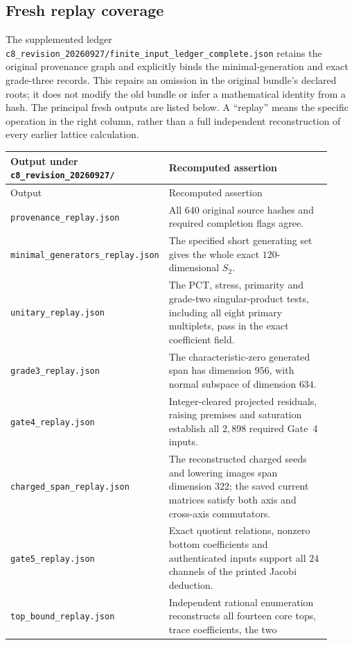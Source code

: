 \documentclass[11pt,a4paper]{article}
\theoremstyle{definition}
\newcommand{\artifact}[1]{\textnormal{\nolinkurl{#1}}}
\begin{document}
\subsection{Fresh replay coverage}
The supplemented ledger
\artifact{c8_revision_20260927/finite_input_ledger_complete.json}
retains the original provenance graph and explicitly binds the
minimal-generation and exact grade-three records. This repairs an
omission in the original bundle's declared roots; it does not modify
the old bundle or infer a mathematical identity from a hash.
The principal fresh outputs are listed below. A ``replay'' means the
specific operation in the right column, rather than a full independent
reconstruction of every earlier lattice calculation.

\begin{longtable}{@{}p{0.38\linewidth}p{0.54\linewidth}@{}}
\toprule
Output under \artifact{c8_revision_20260927/} & Recomputed assertion\\
\midrule\endfirsthead
\toprule Output & Recomputed assertion\\\midrule\endhead
\bottomrule\endfoot
\artifact{provenance_replay.json} & All 640 original source hashes and
required completion flags agree.\\
\artifact{minimal_generators_replay.json} & The specified short
generating set gives the whole exact $120$-dimensional $S_2$.\\
\artifact{unitary_replay.json} & The PCT, stress, primarity and
grade-two singular-product tests, including all eight primary
multiplets, pass in the exact coefficient field.\\
\artifact{grade3_replay.json} & The characteristic-zero generated
span has dimension $956$, with normal subspace of dimension $634$.\\
\artifact{gate4_replay.json} & Integer-cleared projected residuals,
raising premises and saturation establish all $2,898$ required
Gate~4 inputs.\\
\artifact{charged_span_replay.json} & The reconstructed charged
seeds and lowering images span dimension $322$; the saved current
matrices satisfy both axis and cross-axis commutators.\\
\artifact{gate5_replay.json} & Exact quotient relations, nonzero
bottom coefficients and authenticated inputs support all $24$
channels of the printed Jacobi deduction.\\
\artifact{top_bound_replay.json} & Independent rational enumeration
reconstructs all fourteen core tops, trace coefficients, the two

\end{longtable}
\end{document}
